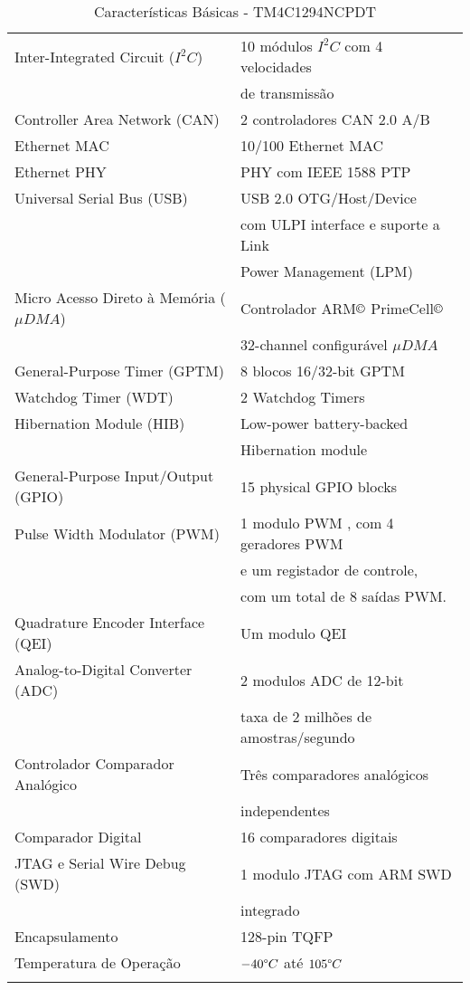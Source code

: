 \begin{longtable}{|l|l|}
\hline
Inter-Integrated Circuit ($I^{2}C$) & 10 módulos $I^{2}C$ com 4 velocidades \\
 & de transmissão\\
\hline
Controller Area Network (CAN) & 2 controladores CAN 2.0 A/B \\
\hline
Ethernet MAC & 10/100 Ethernet MAC \\
\hline
Ethernet PHY & PHY com IEEE 1588 PTP \\
\hline
Universal Serial Bus (USB) & USB 2.0 OTG/Host/Device  \\ 
& com ULPI interface e suporte a Link   \\
& Power Management (LPM) \\
\hline
Micro Acesso Direto à Memória ($\mu DMA$) & Controlador ARM$\copyright$ PrimeCell$\copyright$  \\
& 32-channel configurável  $\mu DMA$ \\
\hline
General-Purpose Timer (GPTM) & 8 blocos 16/32-bit GPTM \\
\hline
Watchdog Timer (WDT) & 2 Watchdog Timers \\
\hline
Hibernation Module (HIB) & Low-power battery-backed \\
 & Hibernation module \\
\hline
General-Purpose Input/Output (GPIO) & 15 physical GPIO blocks \\
\hline
Pulse Width Modulator (PWM) & 1 modulo PWM , com 4 geradores PWM  \\
 & e um  registador de controle,\\
 &  com um total de 8  saídas PWM.\\
\hline
Quadrature Encoder Interface (QEI) & Um modulo QEI \\
\hline
Analog-to-Digital Converter (ADC) & 2 modulos ADC de 12-bit\\
 & taxa de 2 milhões de amostras/segundo\\
\hline
Controlador Comparador Analógico & Três comparadores analógicos \\
& independentes \\
\hline
Comparador Digital & 16 comparadores digitais \\
\hline
JTAG e Serial Wire Debug (SWD) & 1 modulo JTAG  com ARM SWD\\
& integrado \\
\hline
Encapsulamento & 128-pin TQFP \\
\hline
Temperatura de Operação & $-40 \degree C$ até $105 \degree C$ \\
\hline
\caption{Características Básicas - TM4C1294NCPDT \cite{DATASHEET_TIVA}}
\label{tab:CaracteristicasMicro}
\end{longtable}

